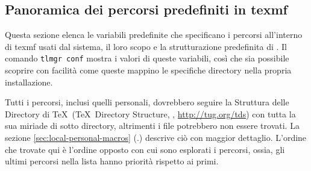 \documentclass{article}
\begin{document}
\subsection{Panoramica dei percorsi predefiniti in texmf}
\label{sec:texmftrees}

Questa sezione elenca le variabili predefinite che specificano i percorsi
all'interno di texmf usati dal sistema, il loro scopo e la strutturazione
predefinita di \TL{}. Il comando \texttt{tlmgr~conf} mostra i valori di
queste variabili, così che sia possibile scoprire con facilità come queste
mappino le specifiche directory nella propria installazione.

Tutti i percorsi, inclusi quelli personali, dovrebbero seguire la Struttura
delle Directory di \TeX\ (\TeX\ Directory Structure, \TDS,
\url{http://tug.org/tds}) con tutta la sua miriade di sotto directory,
altrimenti i file potrebbero non essere trovati. La sezione
\ref{sec:local-personal-macros} (\p.\pageref{sec:local-personal-macros})
descrive ciò con maggior dettaglio. L'ordine che trovate qui è l'ordine
opposto con cui sono esplorati i percorsi, ossia, gli ultimi percorsi
nella lista hanno priorità rispetto ai primi.
\end{document}
